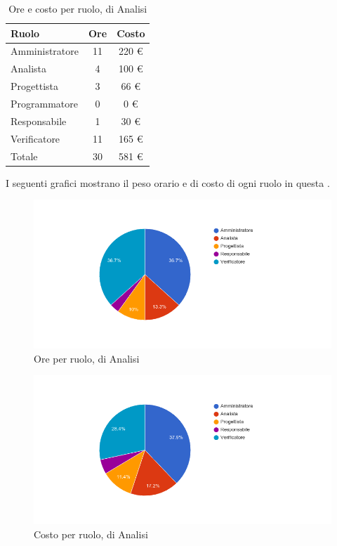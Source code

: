 \begin{table}[H]
	\centering
	\begin{tabular}{ l c c }
		\textbf{Ruolo} & \textbf{Ore} & \textbf{Costo} \\
		\hline
		Amministratore & 11 & 220 \euro{} \\
		Analista & 4 & 100 \euro{} \\
		Progettista & 3 & 66 \euro{} \\
		Programmatore & 0 & 0 \euro{} \\
		Responsabile & 1 & 30 \euro{} \\
		Verificatore & 11 & 165 \euro{} \\
		\hline
		Totale & 30 & 581 \euro{} \\
		\hline
	\end{tabular}
	\caption{Ore e costo per ruolo,  di Analisi}
\end{table}

I seguenti grafici mostrano il peso orario e di costo di ogni ruolo in questa .

\begin{figure}[H]
  \begin{center}
    \includegraphics[width=15cm]{res/img/prospettoEconomico/orePerRuoloAnalisiMiglioramenti.png}
  \caption{Ore per ruolo,  di Analisi}
  \end{center} 
\end{figure}  

\begin{figure}[H]
  \begin{center}
    \includegraphics[width=15cm]{res/img/prospettoEconomico/costoPerRuoloAnalisiMiglioramenti.png}
  \caption{Costo per ruolo,  di Analisi}
  \end{center} 
\end{figure}  


